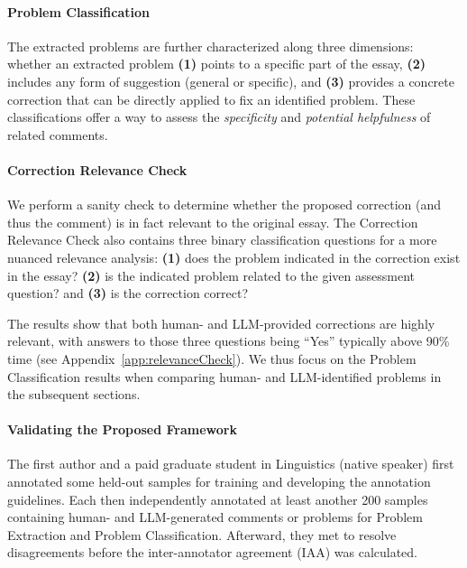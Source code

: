 \paragraph{Problem Classification} The extracted problems are further characterized along three dimensions: whether an extracted problem \textbf{(1)} points to a specific part of the essay, \textbf{(2)} includes any form of suggestion (general or specific), and \textbf{(3)} provides a concrete correction that can be directly applied to fix an identified problem. These classifications offer a way to assess the \textit{specificity} and \textit{potential helpfulness} of related comments.


\paragraph{Correction Relevance Check} We perform a sanity check to determine whether the proposed correction (and thus the comment) is in fact relevant to the original essay. The Correction Relevance Check also contains three binary classification questions for a more nuanced relevance analysis: \textbf{(1)} does the problem indicated in the correction exist in the essay? \textbf{(2)} is the indicated problem related to the given assessment question? and \textbf{(3)} is the correction correct? 

The results show that both human- and LLM-provided corrections are highly relevant, with answers to those three questions being ``Yes'' typically above 90\% time (see Appendix~\ref{app:relevanceCheck}). We thus focus on the Problem Classification results when comparing human- and LLM-identified problems in the subsequent sections.  


\paragraph{Validating the Proposed Framework} The first author and a paid graduate student in Linguistics (native speaker) first annotated some held-out samples for training and developing the annotation guidelines. Each then independently annotated at least another 200 samples containing human- and LLM-generated comments or problems for Problem Extraction and Problem Classification. Afterward, they met to resolve disagreements before the inter-annotator agreement (IAA) was calculated. 

